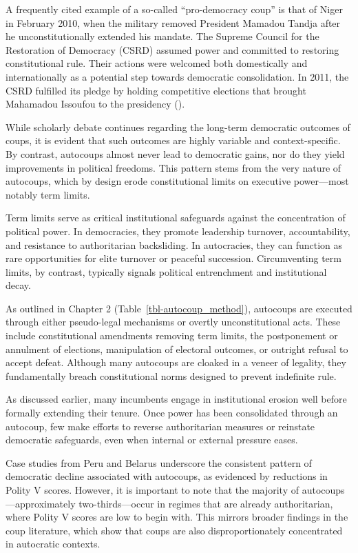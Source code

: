 \documentclass[
  12pt,
]{report}
\begin{document}
A frequently cited example of a so-called ``pro-democracy coup'' is that
of Niger in February 2010, when the military removed President Mamadou
Tandja after he unconstitutionally extended his mandate. The Supreme
Council for the Restoration of Democracy (CSRD) assumed power and
committed to restoring constitutional rule. Their actions were welcomed
both domestically and internationally as a potential step towards
democratic consolidation. In 2011, the CSRD fulfilled its pledge by
holding competitive elections that brought Mahamadou Issoufou to the
presidency ().

While scholarly debate continues regarding the long-term democratic
outcomes of coups, it is evident that such outcomes are highly variable
and context-specific. By contrast, autocoups almost never lead to
democratic gains, nor do they yield improvements in political freedoms.
This pattern stems from the very nature of autocoups, which by design
erode constitutional limits on executive power---most notably term
limits.

Term limits serve as critical institutional safeguards against the
concentration of political power. In democracies, they promote
leadership turnover, accountability, and resistance to authoritarian
backsliding. In autocracies, they can function as rare opportunities for
elite turnover or peaceful succession. Circumventing term limits, by
contrast, typically signals political entrenchment and institutional
decay.

As outlined in Chapter 2 (Table~\ref{tbl-autocoup_method}), autocoups
are executed through either pseudo-legal mechanisms or overtly
unconstitutional acts. These include constitutional amendments removing
term limits, the postponement or annulment of elections, manipulation of
electoral outcomes, or outright refusal to accept defeat. Although many
autocoups are cloaked in a veneer of legality, they fundamentally breach
constitutional norms designed to prevent indefinite rule.

As discussed earlier, many incumbents engage in institutional erosion
well before formally extending their tenure. Once power has been
consolidated through an autocoup, few make efforts to reverse
authoritarian measures or reinstate democratic safeguards, even when
internal or external pressure eases.

Case studies from Peru and Belarus underscore the consistent pattern of
democratic decline associated with autocoups, as evidenced by reductions
in Polity V scores. However, it is important to note that the majority
of autocoups---approximately two-thirds---occur in regimes that are
already authoritarian, where Polity V scores are low to begin with. This
mirrors broader findings in the coup literature, which show that coups
are also disproportionately concentrated in autocratic contexts.
\end{document}
